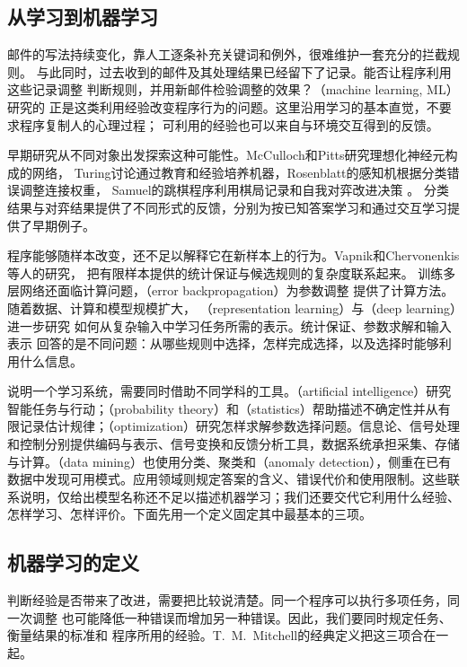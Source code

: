 \subsection{从学习到机器学习}
邮件的写法持续变化，靠人工逐条补充关键词和例外，很难维护一套充分的拦截规则。
与此同时，过去收到的邮件及其处理结果已经留下了记录。能否让程序利用这些记录调整
判断规则，并用新邮件检验调整的效果？（machine learning, ML）研究的
正是这类利用经验改变程序行为的问题。这里沿用学习的基本直觉，不要求程序复制人的心理过程；
可利用的经验也可以来自与环境交互得到的反馈。

早期研究从不同对象出发探索这种可能性。McCulloch和Pitts研究理想化神经元构成的网络，
Turing讨论通过教育和经验培养机器，Rosenblatt的感知机根据分类错误调整连接权重，
Samuel的跳棋程序利用棋局记录和自我对弈改进决策
。
分类结果与对弈结果提供了不同形式的反馈，分别为按已知答案学习和通过交互学习提供了早期例子。

程序能够随样本改变，还不足以解释它在新样本上的行为。Vapnik和Chervonenkis等人的研究，
把有限样本提供的统计保证与候选规则的复杂度联系起来。
训练多层网络还面临计算问题，（error backpropagation）为参数调整
提供了计算方法。随着数据、计算和模型规模扩大，
（representation learning）与（deep learning）进一步研究
如何从复杂输入中学习任务所需的表示。统计保证、参数求解和输入表示
回答的是不同问题：从哪些规则中选择，怎样完成选择，以及选择时能够利用什么信息。

说明一个学习系统，需要同时借助不同学科的工具。（artificial intelligence）研究智能任务与行动；（probability theory）和（statistics）帮助描述不确定性并从有限记录估计规律；（optimization）研究怎样求解参数选择问题。信息论、信号处理和控制分别提供编码与表示、信号变换和反馈分析工具，数据系统承担采集、存储与计算。（data mining）也使用分类、聚类和（anomaly detection），侧重在已有数据中发现可用模式。应用领域则规定答案的含义、错误代价和使用限制。这些联系说明，仅给出模型名称还不足以描述机器学习；我们还要交代它利用什么经验、怎样学习、怎样评价。下面先用一个定义固定其中最基本的三项。

\subsection{机器学习的定义}

判断经验是否带来了改进，需要把比较说清楚。同一个程序可以执行多项任务，同一次调整
也可能降低一种错误而增加另一种错误。因此，我们要同时规定任务、衡量结果的标准和
程序所用的经验。T.~M.~Mitchell的经典定义把这三项合在一起。


